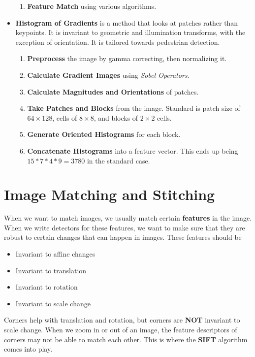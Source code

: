 \documentclass{article}
\begin{document}
\begin{itemize}
\begin{enumerate}
        \item \textbf{Feature Match} using various algorithms.
    \end{enumerate}
    \item \textbf{Histogram of Gradients} is a method that looks at patches rather than keypoints. It is invariant to geometric and illumination transforms, with the exception of orientation. It is tailored towards pedestrian detection. 
    \begin{enumerate}
        \item \textbf{Preprocess} the image by gamma correcting, then normalizing it.
        \item \textbf{Calculate Gradient Images} using \textit{Sobel Operators}.
        \item \textbf{Calculate Magnitudes and Orientations} of patches.
        \item \textbf{Take Patches and Blocks} from the image. Standard is patch size of $64 \times 128$, cells of $8 \times 8$, and blocks of $2 \times 2$ cells.
        \item \textbf{Generate Oriented Histograms} for each block.
        \item \textbf{Concatenate Histograms} into a feature vector. This ends up being $15 * 7 * 4 * 9 = 3780$ in the standard case.
    \end{enumerate}
\end{itemize}
\section{Image Matching and Stitching}
When we want to match images, we usually match certain \textbf{features} in the image. When we write detectors for these features, we want to make sure that they are robust to certain changes that can happen in images. These features should be 
\begin{itemize}
    \item Invariant to affine changes
    \item Invariant to translation
    \item Invariant to rotation
    \item Invariant to scale change
\end{itemize}
Corners help with translation and rotation, but corners are \textbf{NOT} invariant to scale change. When we zoom in or out of an image, the feature descriptors of corners may not be able to match each other. This is where the \textbf{SIFT} algorithm comes into play.
\end{document}
